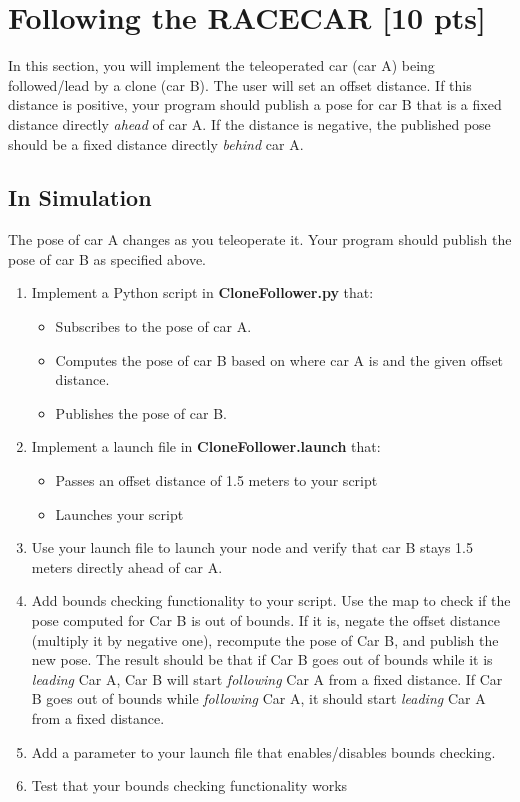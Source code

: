 \documentclass[final]{article}
\begin{document}
\section{Following the RACECAR [10 pts]} 

In this section, you will implement the teleoperated car (car A) being followed/lead by a clone (car B). The user will set an offset distance. If this distance is positive, your program should publish a pose for car B that is a fixed distance directly \textit{ahead} of car A. If the distance is negative, the published pose should be a fixed distance directly \textit{behind} car A.

\subsection{In Simulation}

The pose of car A changes as you teleoperate it. Your program should publish the pose of car B as specified above.

\begin{enumerate}

\item Implement a Python script in \textbf{CloneFollower.py} that:
	\begin{itemize}
		\item Subscribes to the pose of car A.
		\item Computes the pose of car B based on where car A is and the given offset distance.
		\item Publishes the pose of car B.
	\end{itemize}
\item Implement a launch file in \textbf{CloneFollower.launch} that:
	\begin{itemize}
		\item Passes an offset distance of 1.5 meters to your script
		\item Launches your script
	\end{itemize}
\item Use your launch file to launch your node and verify that car B stays 1.5 meters directly ahead of car A.

\item Add bounds checking functionality to your script. Use the map to check if the pose computed for Car B is out of bounds. If it is, negate the offset distance (multiply it by negative one), recompute the pose of Car B, and publish the new pose. The result should be that if Car B goes out of bounds while it is \textit{leading} Car A, Car B will start \textit{following} Car A from a fixed distance. If Car B goes out of bounds while \textit{following} Car A, it should start \textit{leading} Car A from a fixed distance.

\item Add a parameter to your launch file that enables/disables bounds checking. 
\item Test that your bounds checking functionality works
\end{enumerate}
\end{document}
